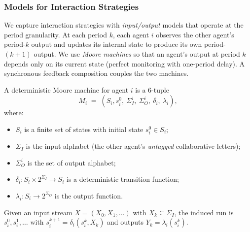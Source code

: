 \documentclass{article}
\begin{document}
  
  
  \subsubsection{Models for Interaction Strategies}
  
  We capture interaction strategies with \emph{input/output} models that operate at the period granularity.
  At each period $k$, each agent $i$ observes the other agent's period-$k$ output and updates its
  internal state to produce its own period-$(k{+}1)$ output. We use \emph{Moore machines} so that an
  agent’s output at period $k$ depends only on its current state (perfect monitoring with one-period delay).
  A synchronous feedback composition couples the two machines.
  
  
  \begin{definition}
  \label{def:moore}
  A deterministic Moore machine for agent $i$ is a 6-tuple
  \[
  M_i \;=\; (S_i, s^0_i,\ \Sigma_I^i,\ \Sigma_O^i,\ \delta_i,\ \lambda_i),
  \]
  where:
  \begin{itemize}
    \item $S_i$ is a finite set of states with initial state $s^0_i\in S_i$;
    \item $\Sigma_I$ is the input alphabet (the other agent’s \emph{untagged} collaborative letters);
    \item $\Sigma_O^i$ is the set of output alphabet;
    \item $\delta_i: S_i \times 2^{\Sigma_I} \to S_i$ is a deterministic transition function;
    \item $\lambda_i: S_i \to 2^{\Sigma_O}$ is the output function.
  \end{itemize}
  Given an input stream $X=(X_0,X_1,\dots)$ with $X_k\subseteq\Sigma_I$, the induced run is
  $s^0_i,s^1_i,\dots$ with $s^{k+1}_i=\delta_i(s^k_i,X_k)$ and outputs $Y_k=\lambda_i(s^k_i)$.
  \end{definition}
  
\end{document}
